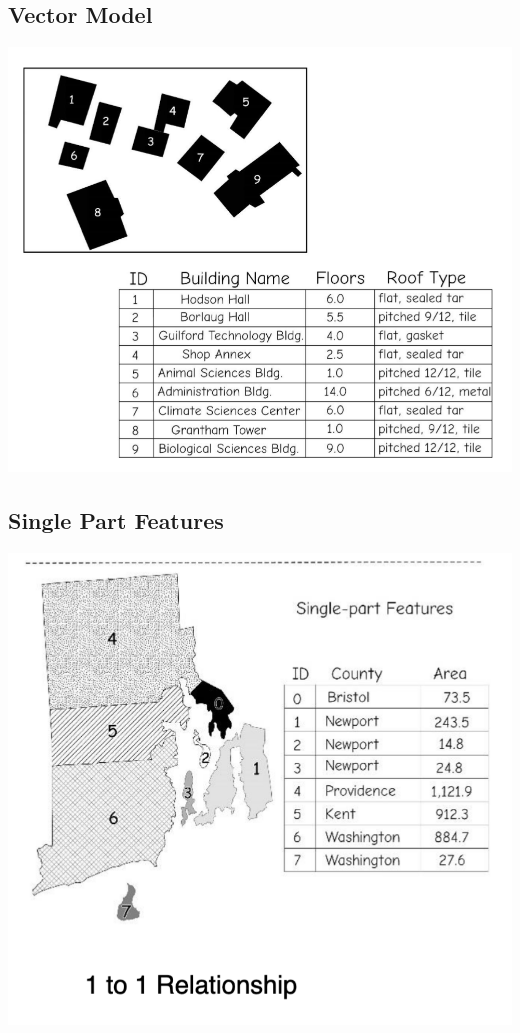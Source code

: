 \documentclass[11pt]{article}
\theoremstyle{definition}
\begin{document}
\subsection{Vector Model}
\includegraphics[width=\textwidth/2]{22.png}

\subsection{Single Part Features}
\includegraphics[width=\textwidth/2]{23.png}
\end{document}
